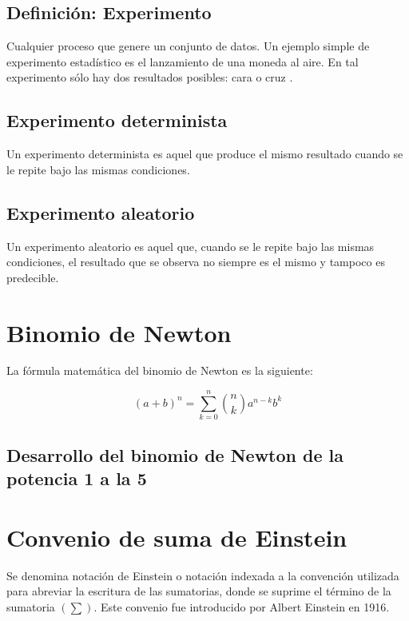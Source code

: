 \documentclass{article}
\begin{document}
\subsection{Definici\'on: Experimento}

Cualquier proceso que genere un conjunto de datos. Un ejemplo simple de
experimento estad\'istico es el lanzamiento de una moneda al aire. En tal
experimento s\'olo hay dos resultados posibles: cara o cruz
\cite{walpole2012probabilidad}.

\subsection{Experimento determinista}
Un experimento determinista es aquel que produce el mismo resultado cuando se le
repite bajo las mismas condiciones.

\subsection{Experimento aleatorio}
Un experimento aleatorio es aquel que, cuando se le repite bajo las mismas
condiciones, el resultado que se observa no siempre es el mismo y tampoco es
predecible.

\section{Binomio de Newton}

La fórmula matemática del binomio de Newton es la siguiente:

\begin{equation}
    (a+b)^n = \sum_{k=0}^{n} \binom{n}{k} a^{n-k} b^k
\end{equation}

\subsection{Desarrollo del binomio de Newton de la potencia 1 a la 5}



\section{Convenio de suma de Einstein}

Se denomina notación de Einstein o notación indexada a la convención utilizada
para abreviar la escritura de las sumatorias, donde se suprime el término de la
sumatoria $(\sum)$. Este convenio fue introducido por Albert Einstein en 1916.
\end{document}
